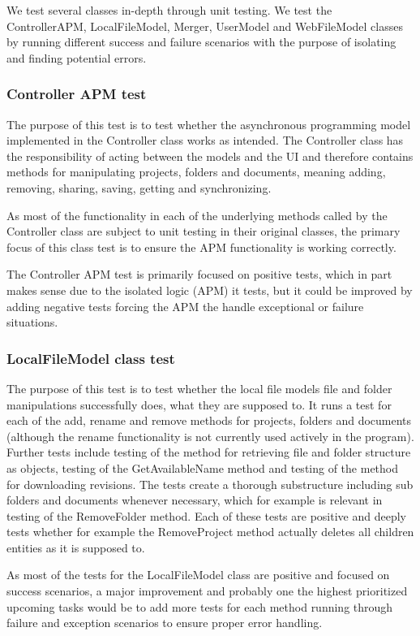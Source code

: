 We test several classes in-depth through unit testing. We test the ControllerAPM, LocalFileModel, Merger, UserModel and WebFileModel classes by running different success and failure scenarios with the purpose of isolating and finding potential errors.

\subsubsection{Controller APM test}
The purpose of this test is to test whether the asynchronous programming model implemented in the Controller class works as intended. The Controller class has the responsibility of acting between the models and the UI and therefore contains methods for manipulating projects, folders and documents, meaning adding, removing, sharing, saving, getting and synchronizing.

As most of the functionality in each of the underlying methods called by the Controller class are subject to unit testing in their original classes, the primary focus of this class test is to ensure the APM functionality is working correctly.

The Controller APM test is primarily focused on positive tests, which in part makes sense due to the isolated logic (APM) it tests, but it could be improved by adding negative tests forcing the APM the handle exceptional or failure situations.

\subsubsection{LocalFileModel class test}
The purpose of this test is to test whether the local file models file and folder manipulations successfully does, what they are supposed to. It runs a test for each of the add, rename and remove methods for projects, folders and documents (although the rename functionality is not currently used actively in the program). Further tests include testing of the method for retrieving file and folder structure as objects, testing of the GetAvailableName method and testing of the method for downloading revisions. The tests create a thorough substructure including sub folders and documents whenever necessary, which for example is relevant in testing of the RemoveFolder method. Each of these tests are positive and deeply tests whether for example the RemoveProject method actually deletes all children entities as it is supposed to.

As most of the tests for the LocalFileModel class are positive and focused on success scenarios, a major improvement and probably one the highest prioritized upcoming tasks would be to add more tests for each method running through failure and exception scenarios to ensure proper error handling.

